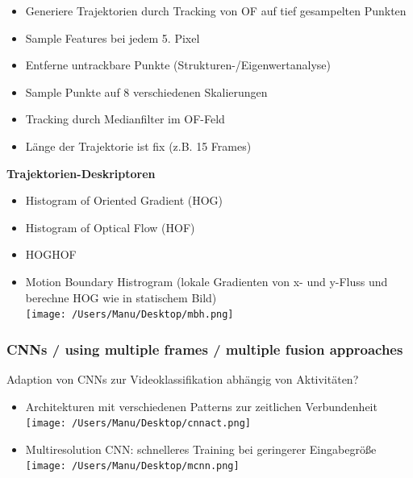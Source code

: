 \documentclass[paper=a4, fontsize=11pt]{scrartcl} %
\numberwithin{equation}{section} %
\numberwithin{figure}{section} %
\numberwithin{table}{section} %
\begin{document}
\begin{itemize}
\item Generiere Trajektorien durch Tracking von OF auf tief gesampelten Punkten
\item Sample Features bei jedem 5. Pixel
\item Entferne untrackbare Punkte (Strukturen-/Eigenwertanalyse)
\item Sample Punkte auf 8 verschiedenen Skalierungen
\item Tracking durch Medianfilter im OF-Feld
\item Länge der Trajektorie ist fix (z.B. 15 Frames)
\end{itemize}

\textbf{Trajektorien-Deskriptoren}

\begin{itemize}
\item Histogram of Oriented Gradient (HOG)
\item Histogram of Optical Flow (HOF)
\item HOGHOF
\item Motion Boundary Histrogram (lokale Gradienten von x- und y-Fluss und berechne HOG wie in statischem Bild)\\
\texttt{[image: /Users/Manu/Desktop/mbh.png]}
\end{itemize}

\subsubsection{CNNs / using multiple frames / multiple fusion approaches}

Adaption von CNNs zur Videoklassifikation abhängig von Aktivitäten?
\begin{itemize}
\item Architekturen mit verschiedenen Patterns zur zeitlichen Verbundenheit\\ 
\texttt{[image: /Users/Manu/Desktop/cnnact.png]}
\item Multiresolution CNN: schnelleres Training bei geringerer Eingabegröße\\ 
\texttt{[image: /Users/Manu/Desktop/mcnn.png]}
\end{itemize}
\end{document}
